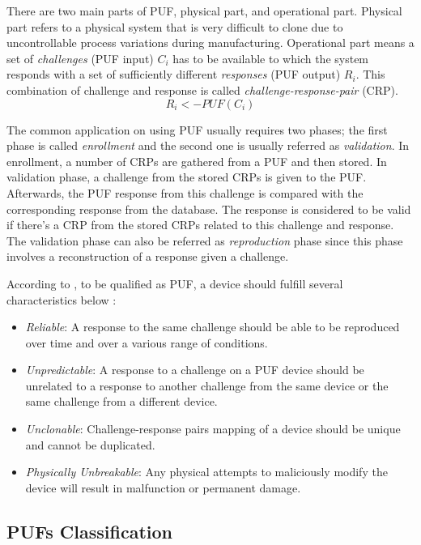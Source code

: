There are two main parts of PUF, physical part, and operational part. Physical part refers to a physical system that is very difficult to clone due to uncontrollable process variations during manufacturing. Operational part means a set of \textit{challenges} (PUF input) $C_i$ has to be available to which the system responds with a set of sufficiently different \textit{responses} (PUF output) $R_i$. This combination of challenge and response is called \textit{challenge-response-pair} (CRP).
\begin{equation}
R_i <- PUF(C_i)
\end{equation}

The common application on using PUF usually requires two phases; the first phase is called \textit{enrollment} and the second one is usually referred as \textit{validation}. In enrollment, a number of CRPs are gathered from a PUF and then stored. In validation phase, a challenge from the stored CRPs is given to the PUF. Afterwards, the PUF response from this challenge is compared with the corresponding response from the database. The response is considered to be valid if there's a CRP from the stored CRPs related to this challenge and response. The validation phase can also be referred as \textit{reproduction} phase since this phase involves a reconstruction of a response given a challenge.

According to \cite{retrospective}, to be qualified as PUF, a device should fulfill several characteristics below :
\begin{itemize}
\item \textit{Reliable}: A response to the same challenge should be able to be reproduced over time and over a various range of conditions.
\item \textit{Unpredictable}: A response to a challenge on a PUF device should be unrelated to a response to another challenge from the same device or the same challenge from a different device.
\item \textit{Unclonable}: Challenge-response pairs mapping of a device should be unique and cannot be duplicated.
\item \textit{Physically Unbreakable}: Any physical attempts to maliciously modify the device will result in malfunction or permanent damage.
\end{itemize}

\subsection{PUFs Classification} \label{lbl:puf-classification}

